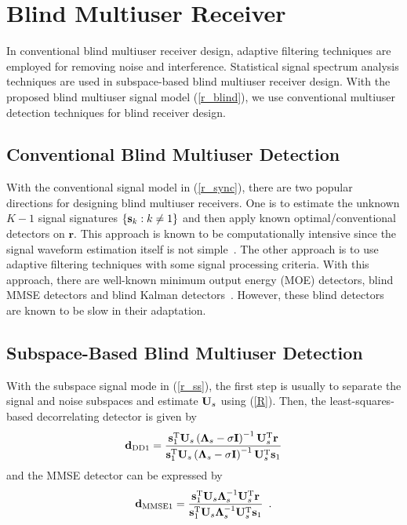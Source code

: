 \documentclass[conference]{IEEEtran}
\newcommand{\br}{{\mathbf r}}
\newcommand{\bd}{{\bf d}}
\newcommand{\bs}{{\bf s}}
\newcommand{\bI}{{\bf I}}
\newcommand{\bU}{{\bf U}}
\newcommand{\bLambda}{{\mbox {\boldmath $\Lambda$}}}
\begin{document}
\section{Blind Multiuser Receiver}
In  conventional blind multiuser receiver design, adaptive
filtering techniques are employed for removing noise and
interference. Statistical signal spectrum analysis techniques are
used in subspace-based blind multiuser receiver design. With the
proposed blind multiuser signal model (\ref{r_blind}), we use
conventional multiuser detection techniques for blind receiver
design.

\subsection{Conventional Blind Multiuser Detection}
With the conventional signal model in (\ref{r_sync}), there are
two popular directions for designing blind multiuser receivers.
One is to estimate the unknown $K-1$ signal signatures
$\left\{\bs_k:k\neq1\right\}$ and then apply known
optimal/conventional detectors on $\br$. This approach is known to
be computationally intensive since the signal waveform estimation
itself is not simple~\cite{Torl97}. The other approach is to use
adaptive filtering techniques with some signal processing criteria.
With this approach, there are well-known minimum output energy
(MOE) detectors, blind MMSE detectors and blind Kalman
detectors~\cite{Honi95,Verd98,Zhang02}. However, these blind
detectors are known to be slow in their adaptation.

\subsection{Subspace-Based Blind Multiuser Detection}
With the subspace signal mode in (\ref{r_ss}), the first step
 is usually to separate the signal and noise subspaces and estimate
$\bU_{s}$ using (\ref{R}). Then, the least-squares-based
decorrelating detector is given by~\cite{Wang98}
\begin{equation}
\bd_{\rm DD1}=\frac{\bs_{1}^{\rm
T}\bU_{s}\left(\bLambda_{s}-\sigma\bI\right)^{-1}\bU_{s}^{\rm
T}\br}
{\bs_1^{\rm
T}\bU_{s}\left(\bLambda_{s}-\sigma\bI\right)^{-1}\bU_{s}^{\rm
T}\bs_{1}}
\end{equation}
and the MMSE detector can be expressed by
\begin{equation}
\bd_{\rm MMSE1} = \frac{\bs_{1}^{\rm
T}\bU_{s}\bLambda_{s}^{-1}\bU_{s}^{\rm T}\br}
{\bs_1^{\rm
T}\bU_{s}\bLambda_{s}^{-1}\bU_{s}^{\rm T}\bs_{1}}
 \enspace .
\end{equation}
\end{document}
